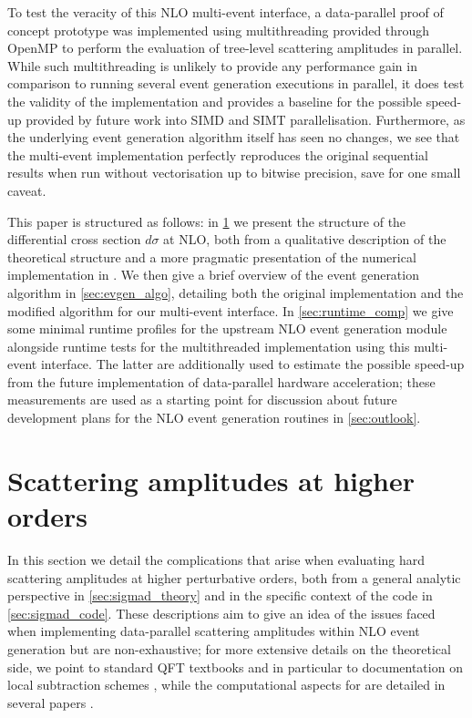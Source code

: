 \documentclass[a4paper,11pt]{article}
\begin{document}
To test the veracity of this NLO multi-event interface, a data-parallel proof of concept prototype was implemented using multithreading provided through OpenMP \cite{openmp} to perform the evaluation of tree-level scattering amplitudes in parallel. While such multithreading is unlikely to provide any performance gain in comparison to running several event generation executions in parallel, it does test the validity of the implementation and provides a baseline for the possible speed-up provided by future work into SIMD and SIMT parallelisation. Furthermore, as the underlying event generation algorithm itself has seen no changes, we see that the multi-event implementation perfectly reproduces the original sequential results when run without vectorisation up to bitwise precision, save for one small caveat.

This paper is structured as follows: in \cref{sec:amplitudes_at_nlo} we present the structure of the differential cross section $d\sigma$ at NLO, both from a qualitative description of the theoretical structure and a more pragmatic presentation of the numerical implementation in \mg{}. We then give a brief overview of the event generation algorithm in \cref{sec:evgen_algo}, detailing both the original implementation and the modified algorithm for our multi-event interface. In \cref{sec:runtime_comp} we give some minimal runtime profiles for the upstream NLO event generation module alongside runtime tests for the multithreaded implementation using this multi-event interface. The latter are additionally used to estimate the possible speed-up from the future implementation of data-parallel hardware acceleration; these measurements are used as a starting point for discussion about future development plans for the NLO event generation routines in \cref{sec:outlook}.



\section{Scattering amplitudes at higher orders}
\label{sec:amplitudes_at_nlo}

In this section we detail the complications that arise when evaluating hard scattering amplitudes at higher perturbative orders, both from a general analytic perspective in \cref{sec:sigmad_theory} and in the specific context of the \mg{} code in \cref{sec:sigmad_code}. These descriptions aim to give an idea of the issues faced when implementing data-parallel scattering amplitudes within \mg{} NLO event generation but are non-exhaustive; for more extensive details on the theoretical side, we point to standard QFT textbooks \cite{Ellis:1991qj,Peskin:1995ev,Zee:706825,Srednicki:2007qs} and in particular to documentation on local subtraction schemes \cite{Frixione:1995ms,Frixione:1997np,Catani:1996jh,Catani:1996vz,Catani:2002hc}, while the computational aspects for \mg{} are detailed in several papers \cite{Frederix:2009yq,Hirschi:2011pa,Frederix:2018nkq}.
\end{document}
